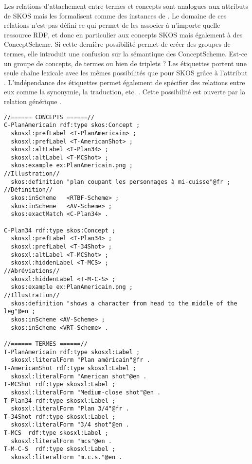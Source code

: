 Les relations d'attachement entre termes et concepts sont analogues aux attributs de SKOS mais les formalisent comme des instances de . 
Le domaine de ces relations n'est pas défini ce qui permet de les associer à n'importe quelle ressource RDF, et donc en particulier aux concepts SKOS mais également à des ConceptScheme. 
Si cette dernière possibilité permet de créer des groupes de termes, elle introduit une confusion sur la sémantique des ConceptScheme.
Est-ce un groupe de concepts, de termes ou bien de triplets ? 
Les étiquettes portent une seule chaîne lexicale avec les mêmes possibilités que pour SKOS grâce à l'attribut . 
L'indépendance des étiquettes permet également de spécifier des relations entre eux comme la synonymie, la traduction, etc. \cite{Pastor2009a}. 
Cette possibilité est ouverte par la relation générique . 


\begin{Verbatim}[fontsize=\small,formatcom=\color{black!70}]
//====== CONCEPTS ======//
C-PlanAmericain rdf:type skos:Concept ; 
  skosxl:prefLabel <T-PlanAmericain> ;
  skosxl:prefLabel <T-AmericanShot> ;
  skosxl:altLabel <T-Plan34> ;
  skosxl:altLabel <T-MCShot> ;
  skos:example ex:PlanAmericain.png ;                               //Illustration//
  skos:definition "plan coupant les personnages à mi-cuisse"@fr ;   //Définition//
  skos:inScheme   <RTBF-Scheme> ;
  skos:inScheme   <AV-Scheme> ;
  skos:exactMatch <C-Plan34> .

C-Plan34 rdf:type skos:Concept ;
  skosxl:prefLabel <T-Plan34> ;
  skosxl:prefLabel <T-34Shot> ;
  skosxl:altLabel <T-MCShot> ;
  skosxl:hiddenLabel <T-MCS> ;                                      //Abréviations//
  skosxl:hiddenLabel <T-M-C-S> ;
  skos:example ex:PlanAmericain.png ;                               //Illustration//
  skos:definition "shows a character from head to the middle of the leg"@en ;
  skos:inScheme <AV-Scheme> ;
  skos:inScheme <VRT-Scheme> .

//====== TERMES ======//
T-PlanAmericain rdf:type skosxl:Label ;
  skosxl:literalForm "Plan américain"@fr .
T-AmericanShot rdf:type skosxl:Label ;
  skosxl:literalForm "American shot"@en .
T-MCShot rdf:type skosxl:Label ;
  skosxl:literalForm "Medium-close shot"@en .
T-Plan34 rdf:type skosxl:Label ;
  skosxl:literalForm "Plan 3/4"@fr .
T-34Shot rdf:type skosxl:Label ;
  skosxl:literalForm "3/4 shot"@en .
T-MCS  rdf:type skosxl:Label ;
  skosxl:literalForm "mcs"@en .
T-M-C-S  rdf:type skosxl:Label ;
  skosxl:literalForm "m.c.s."@en .
\end{Verbatim}


